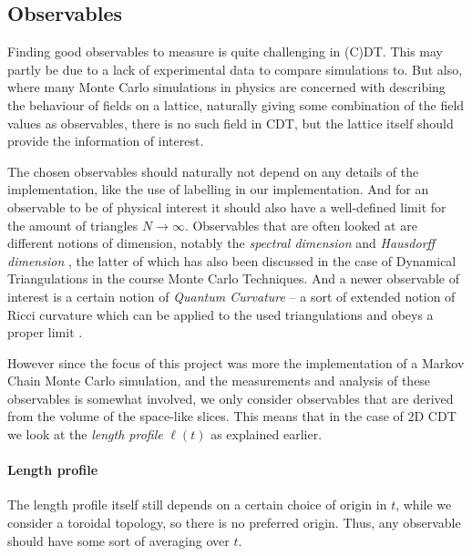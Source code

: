 \subsection{Observables} \label{sec:observables}
Finding good observables to measure is quite challenging in (C)DT. This may partly be due to a lack of experimental data to compare simulations to.
But also, where many Monte Carlo simulations in physics are concerned with describing the behaviour of fields on a lattice, naturally giving some combination of the field values as observables,
there is no such field in CDT, but the lattice itself should provide the information of interest.

The chosen observables should naturally not depend on any details of the implementation, like the use of labelling in our implementation.
And for an observable to be of physical interest it should also have a well-defined limit for the amount of triangles $N \rightarrow \infty$.
Observables that are often looked at are different notions of dimension, notably the \emph{spectral dimension} \cite{2012} and \emph{Hausdorff dimension} \cite{1998, 2012}, the latter of which has also been discussed in the case of Dynamical Triangulations in the course Monte Carlo Techniques. And a newer observable of interest is a certain notion of \emph{Quantum Curvature} -- a sort of extended notion of Ricci curvature which can be applied to the used triangulations and obeys a proper limit \cite{brunekreef2021}.

However since the focus of this project was more the implementation of a Markov Chain Monte Carlo simulation, and the measurements and analysis of these observables is somewhat involved, we only consider observables that are derived from the volume of the space-like slices.
This means that in the case of 2D CDT we look at the \emph{length profile} $\ell(t)$ as explained earlier.

\paragraph{Length profile}
The length profile itself still depends on a certain choice of origin in $t$, while we consider a toroidal topology, so there is no preferred origin. Thus, any observable should have some sort of averaging over $t$.

